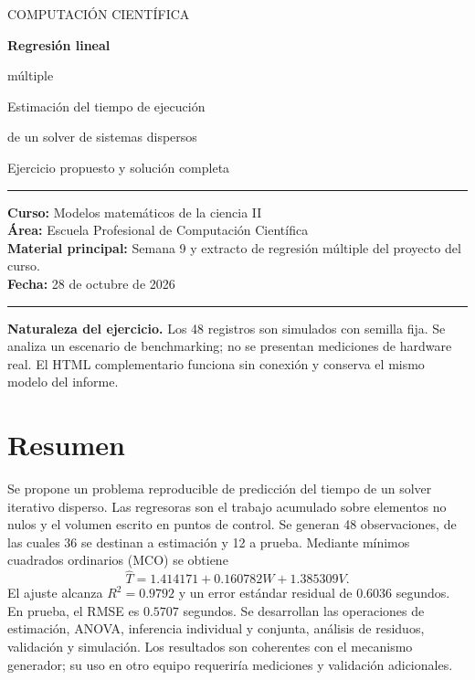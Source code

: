 \documentclass[11pt,a4paper]{article}
\begin{document}
\hypersetup{pageanchor=false}
\begin{titlepage}
\vspace*{1.7cm}
{\color{verde}\large COMPUTACIÓN CIENTÍFICA\par}
\vspace{0.7cm}
{\color{azul}\Huge\bfseries Regresión lineal\par múltiple\par}
\vspace{0.8cm}
{\LARGE Estimación del tiempo de ejecución\par de un solver de sistemas dispersos\par}
\vspace{0.7cm}
{\large Ejercicio propuesto y solución completa\par}
\vspace{1.3cm}
\rule{\linewidth}{0.6pt}
\textbf{Curso:} Modelos matemáticos de la ciencia II\\
\textbf{Área:} Escuela Profesional de Computación Científica\\
\textbf{Material principal:} Semana 9 y extracto de regresión múltiple del proyecto del curso.\\
\textbf{Fecha:} 28 de octubre de 2026\par
\rule{\linewidth}{0.6pt}
\vfill
\colorbox{verde!8}{\parbox{.94\linewidth}{\textbf{Naturaleza del ejercicio.} Los 48 registros son simulados con semilla fija. Se analiza un escenario de benchmarking; no se presentan mediciones de hardware real. El HTML complementario funciona sin conexión y conserva el mismo modelo del informe.}}
\end{titlepage}
\hypersetup{pageanchor=true}

\section*{Resumen}
Se propone un problema reproducible de predicción del tiempo de un solver iterativo disperso. Las regresoras son el trabajo acumulado sobre elementos no nulos y el volumen escrito en puntos de control. Se generan 48 observaciones, de las cuales 36 se destinan a estimación y 12 a prueba. Mediante mínimos cuadrados ordinarios (MCO) se obtiene
\[
\widehat T=1.414171+0.160782W+1.385309V.
\]
El ajuste alcanza $R^2=0.9792$ y un error estándar residual de $0.6036$ segundos. En prueba, el RMSE es $0.5707$ segundos. Se desarrollan las operaciones de estimación, ANOVA, inferencia individual y conjunta, análisis de residuos, validación y simulación. Los resultados son coherentes con el mecanismo generador; su uso en otro equipo requeriría mediciones y validación adicionales.
\end{document}
